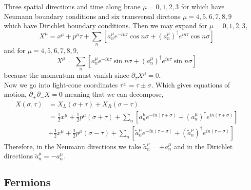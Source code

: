 \documentclass[12pt]{extarticle}
\begin{document}
\begin{example}[D3-BRANE in 10D]
Three spatial directions and time along brane $\mu = 0,1,2,3$ for which have Neumann boundary conditions and six transversal dirctons $\mu = 4,5,6,7,8,9$ which have Dirichlet boundary conditions. Then we may expand for $\mu = 0,1,2,3$,
\[ X^\mu = x^\mu + p^\mu \tau + \sum_n [a_n^\mu e^{-i n \tau} \cos{n \sigma} + (a^\mu_n)^\dagger e^{in \tau} \cos{n \sigma} ] \]
and for $\mu = 4,5,6,7,8,9$,
\[ X^\mu = \sum_n [a_n^\mu e^{-i n \tau} \sin{n \sigma} + (a^\mu_n)^\dagger e^{in \tau} \sin{n \sigma} ] \]
because the momentum must vanish since $\partial_\tau X^\mu = 0$. 
\bigskip\\
Now we go into light-cone coordinates $\tau^{\pm} = \tau \pm \sigma$. Which gives equations of motion, $\partial_{+} \partial_{-} X = 0$ meaning that we can decompose,
\begin{align*}
X(\sigma, \tau) & = X_L(\sigma + \tau) + X_R(\sigma - \tau) 
\\
& = \tfrac{1}{2} x^\mu + \tfrac{1}{2} p^\mu (\sigma + \tau) + \sum_n [a^\mu_n e^{-i n (\tau + \sigma)} + (a^\mu_n)^\dagger e^{in(\tau + \sigma)} ]
\\
& +  \tfrac{1}{2} x^\mu + \tfrac{1}{2} p^\mu (\sigma - \tau) + \sum_n [ \tilde{a}^\mu_n e^{-i n (\tau - \sigma)} + (\tilde{a}^\mu_n)^\dagger e^{in(\tau - \sigma)} ]
\end{align*}
Therefore, in the Neumann directions we take $\tilde{a}^\mu_n = + a^\mu_n$ and in the Dirichlet directions $\tilde{a}^\mu_n = - a^\mu_n$.
\end{example} 

\subsection{Fermions}
\end{document}
